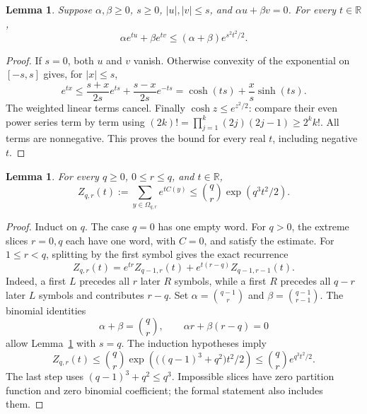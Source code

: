 \documentclass[11pt,a4paper]{article}
\newtheorem{lemma}[theorem]{Lemma}
\newcommand{\R}{\mathbb R}
\begin{document}
\begin{lemma}\label{lem:two}
Suppose $\alpha,\beta\geq0$, $s\geq0$, $|u|,|v|\leq s$, and
$\alpha u+\beta v=0$. For every $t\in\R$,
\[
\alpha e^{tu}+\beta e^{tv}\leq(\alpha+\beta)e^{s^2t^2/2}.
\]
\end{lemma}
\begin{proof}
If $s=0$, both $u$ and $v$ vanish. Otherwise convexity of the exponential
on $[-s,s]$ gives, for $|x|\leq s$,
\[
e^{tx}\leq\frac{s+x}{2s}e^{ts}+\frac{s-x}{2s}e^{-ts}
=\cosh(ts)+\frac{x}{s}\sinh(ts).
\]
The weighted linear terms cancel. Finally
$\cosh z\leq e^{z^2/2}$: compare their even power series term by term using
$(2k)!=\prod_{j=1}^k(2j)(2j-1)\geq2^k k!$. All terms are nonnegative. This proves the bound for every
real $t$, including negative $t$.
\end{proof}

\begin{lemma}\label{lem:partition}
For every $q\geq0$, $0\leq r\leq q$, and $t\in\R$,
\begin{equation}\label{eq:partition}
Z_{q,r}(t):=\sum_{y\in\Omega_{q,r}}e^{tC(y)}
\leq\binom qr\exp(q^3t^2/2).
\end{equation}
\end{lemma}
\begin{proof}
Induct on $q$. The case $q=0$ has one empty word. For $q>0$, the extreme
slices $r=0,q$ each have one word, with $C=0$, and satisfy the estimate.
For $1\leq r<q$, splitting by the first symbol gives the exact recurrence
\[
Z_{q,r}(t)=e^{tr}Z_{q-1,r}(t)+e^{t(r-q)}Z_{q-1,r-1}(t).
\]
Indeed, a first $L$ precedes all $r$ later $R$ symbols, while a first $R$
precedes all $q-r$ later $L$ symbols and contributes $r-q$.
Set $\alpha=\binom{q-1}{r}$ and $\beta=\binom{q-1}{r-1}$. The binomial
identities
\[
\alpha+\beta=\binom qr,\qquad \alpha r+\beta(r-q)=0
\]
allow Lemma~\ref{lem:two} with $s=q$. The induction hypotheses imply
\[
Z_{q,r}(t)\leq\binom qr
\exp\!\left(\bigl((q-1)^3+q^2\bigr)t^2/2\right)
\leq\binom qr e^{q^3t^2/2}.
\]
The last step uses $(q-1)^3+q^2\leq q^3$. Impossible slices have zero
partition function and zero binomial coefficient; the formal statement
also includes them.
\end{proof}
\end{document}
